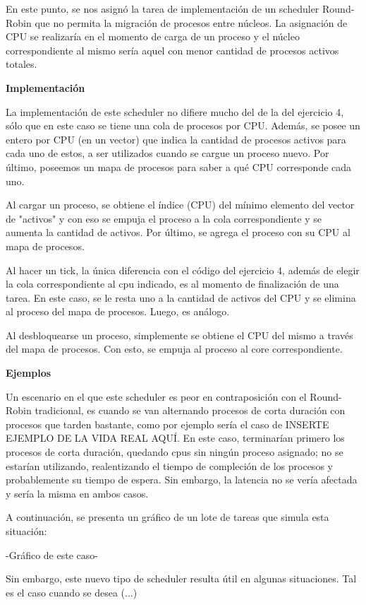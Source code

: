 En este punto, se nos asignó la tarea de implementación de un scheduler Round-Robin que no permita la migración de procesos
entre núcleos. La asignación de CPU se realizaría en el momento de carga de un proceso y el núcleo correspondiente al mismo sería aquel con menor cantidad de procesos activos totales.

\textbf{Implementación}

La implementación de este scheduler no difiere mucho del de la del ejercicio 4, sólo que en este caso se tiene una  cola de procesos por CPU. Además, se posee un entero por CPU (en un vector) que indica la cantidad de procesos activos para cada uno de estos, a ser utilizados cuando se cargue un proceso nuevo. Por último, poseemos un mapa de procesos para saber a qué CPU corresponde cada uno.

Al cargar un proceso, se obtiene el índice (CPU) del mínimo elemento del vector de "activos" y con eso se empuja el proceso a la cola correspondiente y se aumenta la cantidad de activos. Por último, se agrega el proceso con su CPU al mapa de procesos.

Al hacer un tick, la única diferencia con el código del ejercicio 4, además de elegir la cola correspondiente al cpu indicado, es al momento de finalización de una tarea. En este caso, se le resta uno a la cantidad de activos del CPU y se elimina al proceso del mapa de procesos. Luego, es análogo.

Al desbloquearse un proceso, simplemente se obtiene el CPU del mismo a través del mapa de procesos. Con esto, se empuja al proceso al core correspondiente.

\textbf{Ejemplos}

Un escenario en el que este scheduler es peor en contraposición con el Round-Robin tradicional, es cuando se van alternando procesos de corta duración con procesos que tarden bastante, como por ejemplo sería el caso de INSERTE EJEMPLO DE LA VIDA REAL AQUÍ. En este caso, terminarían primero los procesos de corta duración, quedando cpus sin ningún proceso asignado; no se estarían utilizando, realentizando el tiempo de compleción de los procesos y probablemente su tiempo de espera. Sin embargo, la latencia no se vería afectada y sería la misma en ambos casos.

A continuación, se presenta un gráfico de un lote de tareas que simula esta situación:

-Gráfico de este caso-



Sin embargo, este nuevo tipo de scheduler resulta útil en algunas situaciones. Tal es el caso cuando se desea (...)

